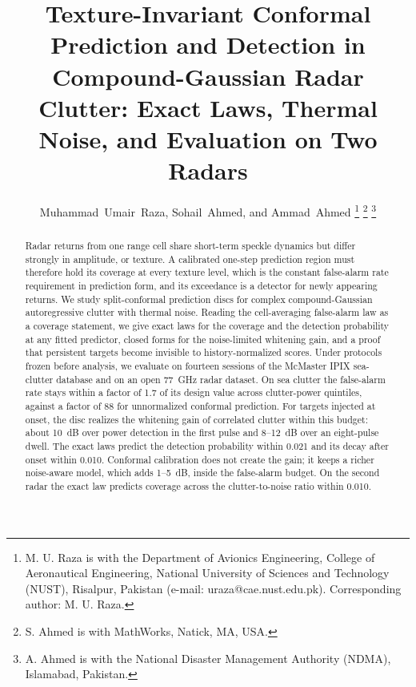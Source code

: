\documentclass[journal]{IEEEtran}
\begin{document}
\title{Texture-Invariant Conformal Prediction and Detection in Compound-Gaussian Radar Clutter: Exact Laws, Thermal Noise, and Evaluation on Two Radars}

\author{Muhammad~Umair~Raza, Sohail~Ahmed, and Ammad~Ahmed%
\thanks{M. U. Raza is with the Department of Avionics Engineering, College of Aeronautical Engineering, National University of Sciences and Technology (NUST), Risalpur, Pakistan (e-mail: uraza@cae.nust.edu.pk). Corresponding author: M. U. Raza.}%
\thanks{S. Ahmed is with MathWorks, Natick, MA, USA.}%
\thanks{A. Ahmed is with the National Disaster Management Authority (NDMA), Islamabad, Pakistan.}}

\maketitle

\begin{abstract}
Radar returns from one range cell share short-term speckle dynamics but differ strongly in amplitude, or texture. A calibrated one-step prediction region must therefore hold its coverage at every texture level, which is the constant false-alarm rate requirement in prediction form, and its exceedance is a detector for newly appearing returns. We study split-conformal prediction discs for complex compound-Gaussian autoregressive clutter with thermal noise. Reading the cell-averaging false-alarm law as a coverage statement, we give exact laws for the coverage and the detection probability at any fitted predictor, closed forms for the noise-limited whitening gain, and a proof that persistent targets become invisible to history-normalized scores. Under protocols frozen before analysis, we evaluate on fourteen sessions of the McMaster IPIX sea-clutter database and on an open 77~GHz radar dataset. On sea clutter the false-alarm rate stays within a factor of 1.7 of its design value across clutter-power quintiles, against a factor of 88 for unnormalized conformal prediction. For targets injected at onset, the disc realizes the whitening gain of correlated clutter within this budget: about 10~dB over power detection in the first pulse and 8--12~dB over an eight-pulse dwell. The exact laws predict the detection probability within 0.021 and its decay after onset within 0.010. Conformal calibration does not create the gain; it keeps a richer noise-aware model, which adds 1--5~dB, inside the false-alarm budget. On the second radar the exact law predicts coverage across the clutter-to-noise ratio within 0.010.
\end{abstract}
\end{document}
